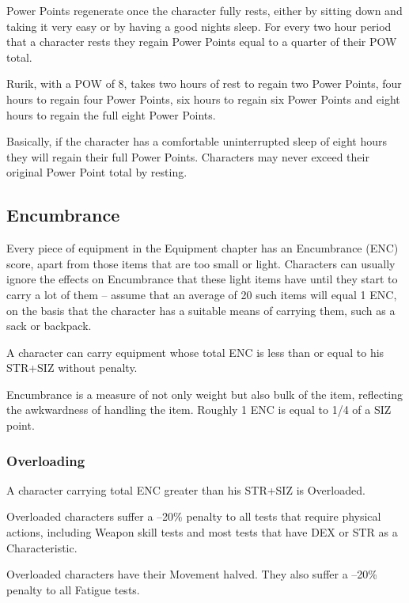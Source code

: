 Power Points regenerate once the character fully rests, either by sitting down and taking it very easy or by having a good nights sleep.
For every two hour period that a character rests they regain Power Points equal to a quarter of their POW total. 

\begin{rpg-examplebox}
Rurik, with a POW of 8, takes two hours of rest to regain two Power Points, four hours to regain four Power Points, six hours to regain six Power Points and eight hours to regain the full eight Power Points. 
\end{rpg-examplebox}

Basically, if the character has a comfortable uninterrupted sleep of eight hours they will regain their full Power Points. Characters may never exceed their original Power Point total by resting.


\subsection{Encumbrance}
\label{ssec:encumbrance}
Every piece of equipment in the Equipment chapter has an Encumbrance (ENC) score, apart from those items that are too small or light. Characters can usually ignore the effects on Encumbrance that these light items have until they start to carry a lot of them – assume that an average of 20 such items will equal 1 ENC, on the basis that the character has a suitable means of carrying them, such as a sack or backpack. 

A character can carry equipment whose total ENC is less than or equal to his STR+SIZ without penalty. 

Encumbrance is a measure of not only weight but also bulk of the item, reflecting the awkwardness of handling the item. Roughly 1 ENC is equal to 1/4 of a SIZ point.

\subsubsection{Overloading}
A character carrying total ENC greater than his STR+SIZ is Overloaded. 
\begin{rpg-list}
\item Overloaded characters suffer a –20\% penalty to all tests that require physical actions, including Weapon skill tests and most tests that have DEX or STR as a Characteristic. 

\item Overloaded characters have their Movement halved. They also suffer a –20\% penalty to all Fatigue tests. 
\end{rpg-list}

